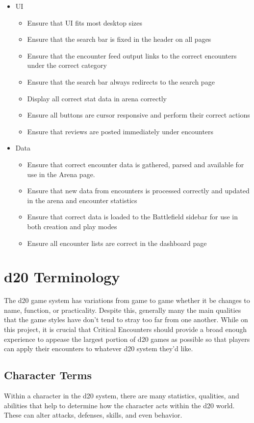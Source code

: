 \documentclass[12pt,a4paper]{report}
\begin{document}
\begin{itemize}
	\item{UI}
		\begin{itemize}
			\item Ensure that UI fits most desktop sizes 
			\item Ensure that the search bar is fixed in the header on all pages
			\item Ensure that the encounter feed output links to the correct encounters under the correct category
			\item Ensure that the search bar always redirects to the search page
			\item Display all correct stat data in arena correctly
			\item Ensure all buttons are cursor responsive and perform their correct actions
			\item Ensure that reviews are posted immediately under encounters
		\end{itemize}
	\item Data
		\begin{itemize}
			\item Ensure that correct encounter data is gathered, parsed and available for use in the Arena page.
			\item Ensure that new data from encounters is processed correctly and updated in the arena and encounter statistics
			\item Ensure that correct data is loaded to the Battlefield sidebar for use in both creation and play modes
			\item Ensure all encounter lists are correct in the dashboard page
		\end{itemize}
\end{itemize}
\newpage
\section{d20 Terminology}
		The d20 game system has variations from game to game whether it be changes to name, function, or practicality. Despite this, generally many the main qualities that the game styles have don't tend to stray too far from one another. While on this project, it is crucial that Critical Encounters should provide a broad enough experience to appease the largest portion of d20 games as possible so that players can apply their encounters to whatever d20 system they'd like. 
		\subsection{Character Terms}
			Within a character in the d20 system, there are many statistics, qualities, and abilities that help to determine how the character acts within the d20 world. These can alter attacks, defenses, skills, and even behavior.
\end{document}
